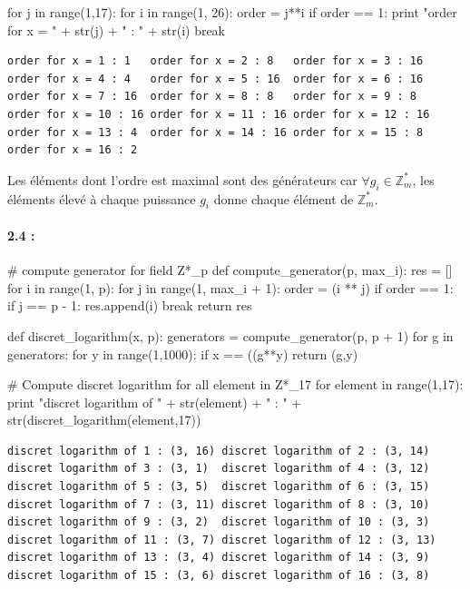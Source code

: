 \documentclass[11pt,a4paper]{report}
\begin{document}
\begin{pythoncode}
for j in range(1,17):
    for i in range(1, 26):
        order = j**i %
        if order == 1:
            print "order for x = " + str(j) + " : " + str(i)
            break
\end{pythoncode}

\begin{verbatim}
order for x = 1 : 1   order for x = 2 : 8   order for x = 3 : 16
order for x = 4 : 4   order for x = 5 : 16  order for x = 6 : 16 
order for x = 7 : 16  order for x = 8 : 8   order for x = 9 : 8 
order for x = 10 : 16 order for x = 11 : 16 order for x = 12 : 16
order for x = 13 : 4  order for x = 14 : 16 order for x = 15 : 8
order for x = 16 : 2
\end{verbatim}

Les éléments dont l'ordre est maximal sont des générateurs car $\forall g_i \in \mathbb{Z}^*_m$, les éléments élevé à chaque puissance $g_i$ donne chaque élément de $\mathbb{Z}^*_m$.

\paragraph*{2.4 : }
\begin{pythoncode}
# compute generator for field Z*_p
def compute_generator(p, max_i):
    res = []
    for i in range(1, p):
        for j in range(1, max_i + 1):
            order = (i ** j) %
            if order == 1:
                if j == p - 1:
                    res.append(i)
                break
    return res

def discret_logarithm(x, p):
    generators = compute_generator(p, p + 1)
    for g in generators:
        for y in range(1,1000):
            if x == ((g**y) %
                return (g,y)


# Compute discret logarithm for all element in Z*_17
for element in range(1,17):
    print "discret logarithm of " + str(element) + " : " + str(discret_logarithm(element,17))
\end{pythoncode}
\begin{verbatim}
discret logarithm of 1 : (3, 16) discret logarithm of 2 : (3, 14)
discret logarithm of 3 : (3, 1)  discret logarithm of 4 : (3, 12)
discret logarithm of 5 : (3, 5)  discret logarithm of 6 : (3, 15)
discret logarithm of 7 : (3, 11) discret logarithm of 8 : (3, 10)
discret logarithm of 9 : (3, 2)  discret logarithm of 10 : (3, 3)
discret logarithm of 11 : (3, 7) discret logarithm of 12 : (3, 13)
discret logarithm of 13 : (3, 4) discret logarithm of 14 : (3, 9)
discret logarithm of 15 : (3, 6) discret logarithm of 16 : (3, 8)
\end{verbatim}
\end{document}
